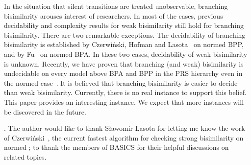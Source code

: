 \documentclass{llncs}
\begin{document}
In the situation that silent transitions are treated unobservable, branching bisimilarity arouses interest of researchers. In most of the cases, previous decidability and complexity results for weak bisimilarity still hold for branching bisimilarity. There are two remarkable exceptions. The decidability of branching bisimilarity is established by Czerwi\'{n}ski, Hofman and Lasota~\cite{DBLP:conf/concur/CzerwinskiHL11} on normed BPP, and by Fu~\cite{DBLP:conf/icalp/Fu13} on  normed BPA.  In these two cases, decidability of weak bisimilarity is unknown.  Recently, we have proven that branching (and weak) bisimilarity is undecidable on every model above BPA and BPP in the PRS hierarchy even in the normed case~\cite{DBLP:conf/icalp/YinFHHT14}. It is believed that branching bisimilarity is easier to decide than weak bisimilarity. Currently, there is no real instance to support this belief. This paper provides an interesting instance. We expect that more instances will be discovered in the future.





\vspace*{4.5mm}.  The author would like to thank S{\l}awomir Lasota for letting me know the work of Czerwi\'{n}ski~\cite{CzerwinskiPhD}, the current fastest algorithm for checking strong bisimilarity on normed ;
to thank the members of BASICS for their helpful discussions on related topics.









\newpage
\end{document}
